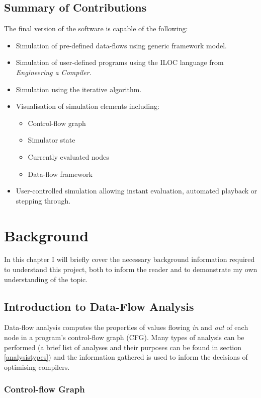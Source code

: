 \documentclass[bsc,twoside,singlespacing,parskip,logo]{infthesis}     %
\begin{document}
    \section{Summary of Contributions}
	The final version of the software is capable of the following:
    
	\begin{itemize}
	\item Simulation of pre-defined data-flows using generic framework model.
    \item Simulation of user-defined programs using the ILOC\cite[appx. A]{eac} language from {\em Engineering a Compiler}.
    \item Simulation using the iterative algorithm.
    \item Visualisation of simulation elements including:
    	\begin{itemize}
    	\item Control-flow graph
        \item Simulator state
        \item Currently evaluated nodes
        \item Data-flow framework
        \end{itemize}
    \item User-controlled simulation allowing instant evaluation, automated playback or stepping through.
	\end{itemize}


\chapter{Background}
In this chapter I will briefly cover the necessary background information required to understand this project, both to inform the reader and to demonstrate my own understanding of the topic.

	\section{Introduction to Data-Flow Analysis}
	Data-flow analysis computes the properties of values flowing {\em in} and {\em out} of each node in a program's control-flow graph (CFG). Many types of analysis can be performed (a brief list of analyses and their purposes can be found in section \ref{analysistypes}) and the information gathered is used to inform the decisions of optimising compilers.
    
    	\subsection{Control-flow Graph}
\end{document}
